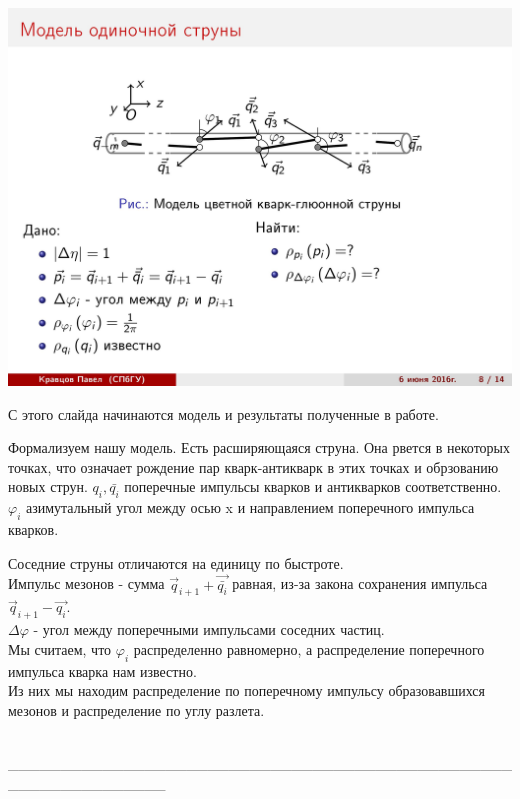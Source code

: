 \documentclass[14pt]{article}
\renewcommand{\phi}{\varphi}
\renewcommand{\line}{\\ \_\_\_\_\_\_\_\_\_\_\_\_\_\_\_\_\_\_\_\_\_\_\_\_\_\_\_\_\_\_\_\_\_\_\_\_\_\_\_\_\_\_\_\_\_\_\_\_\_\_\_\_\_\_\_\_\_\_\_\_\_\_\_ \\ }
\begin{document}
\begin{minipage}[h]{0.33\linewidth}
\includegraphics[width=1\linewidth]{page-08.jpg}
\end{minipage}
\begin{minipage}[h]{0.65\linewidth}
С этого слайда начинаются модель и результаты полученные в работе.

Формализуем нашу модель. Есть расширяющаяся струна. Она рвется в некоторых точках, что означает рождение пар кварк-антикварк в этих точках и обрзованию новых струн. $q_i, \bar{q_i}$ поперечные импульсы кварков и антикварков соответственно. $\phi_i$ азимутальный угол между осью x и направлением поперечного импульса кварков.

Соседние струны отличаются на единицу по быстроте. \\
Импульс мезонов - сумма  $\vec{q}_{i+1} + \vec{\bar{q_i}}$ равная, из-за закона сохранения импульса $\vec{q}_{i+1} - \vec{q_i}$. \\
$\Delta \phi$ - угол между поперечными импульсами соседних частиц. \\
Мы считаем, что $\phi_i$ распределенно равномерно, а распределение поперечного импульса кварка нам известно. \\
Из них мы находим распределение по поперечному импульсу образовавшихся мезонов и распределение по углу разлета.
\end{minipage}
\line
\end{document}
